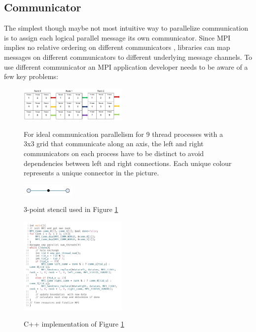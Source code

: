 \documentclass[sigconf]{acmart}
\begin{document}
\subsection{Communicator}

The simplest though maybe not most intuitive way to parallelize communication is to assign each logical parallel message its own communicator.
Since MPI implies no relative ordering on different communicators \cite{zambreLessonsLearned2022}, libraries can map messages on different communicators to different underlying message channels.
To use different communicator an MPI application developer needs to be aware of a few key problems:

\begin{figure}
    \caption{
        For ideal communication parallelism for 9 thread processes with a 3x3 grid that communicate along an axis, the left and right communicators on each process have to be distinct to avoid dependencies between left and right connections.
        Each unique colour represents a unique connector in the picture.
    }
    \includegraphics[width=0.47\textwidth]{Communicator_Line.png}
    \label{fig:Communicator_Line}
\end{figure}

\begin{figure}
    \caption{3-point stencil used in Figure \ref{fig:Communicator_Line}}
    \includegraphics[width=0.23\textwidth]{3_point_stencil.png}
    \label{fig:3pointStencil}
\end{figure}

\begin{figure}
    \caption{C++ implementation of Figure \ref{fig:Communicator_Line}}
    \includegraphics[width=0.47\textwidth]{Communicator_Line_CPP.png}
    \label{fig:Communicator_Line_CPP}
\end{figure}
\end{document}
